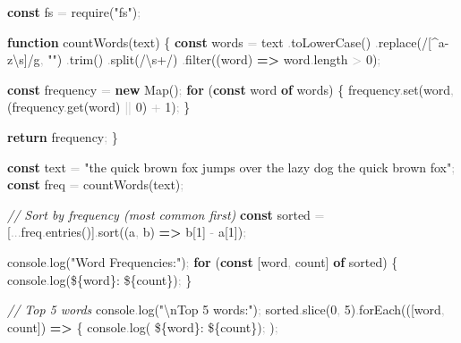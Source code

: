 \documentclass[
  justified,
  openright,
]{tufte-book}
\newcommand{\KeywordTok}[1]{\textcolor{CodeKeyword}{\textbf{#1}}}  %
\newcommand{\StringTok}[1]{\textcolor{CodeString}{#1}}              %
\newcommand{\CommentTok}[1]{\textcolor{CodeComment}{\textit{#1}}}  %
\newcommand{\CodeNumTok}[1]{\textcolor{CodeNumber}{#1}}             %
\newcommand{\CodeFuncTok}[1]{\textcolor{CodeKeyword}{#1}}           %
\newcommand{\CodeTypeTok}[1]{\textcolor{CodeType}{#1}}              %
\newcommand{\CodeAccentTok}[1]{\textcolor{CodeAccent}{#1}}          %
\newcommand{\OperatorTok}[1]{\textcolor{DarkGray}{#1}}              %
\newenvironment{Shaded}{%
  \begin{mdframed}[style=TufteCode]%
}{%
  \end{mdframed}%
}
\begin{document}
\begin{Shaded}
\begin{Highlighting}[]
\KeywordTok{const} fs \OperatorTok{=} \CodeAccentTok{require}(\StringTok{"fs"})\OperatorTok{;}
 
\KeywordTok{function} \CodeFuncTok{countWords}(text) \{
  \KeywordTok{const} words \OperatorTok{=} text
    \OperatorTok{.}\CodeFuncTok{toLowerCase}()
    \OperatorTok{.}\CodeFuncTok{replace}(\StringTok{/}\StringTok{[\^{}a{-}z\textbackslash{}s]}\StringTok{/g}\OperatorTok{,} \StringTok{""})
    \OperatorTok{.}\CodeFuncTok{trim}()
    \OperatorTok{.}\CodeFuncTok{split}(\StringTok{/}\StringTok{\textbackslash{}s+}\StringTok{/})
    \OperatorTok{.}\CodeFuncTok{filter}((word) \KeywordTok{=\textgreater{}} word\OperatorTok{.}\CodeTypeTok{length} \OperatorTok{\textgreater{}} \CodeNumTok{0})\OperatorTok{;}
 
  \KeywordTok{const} frequency \OperatorTok{=} \KeywordTok{new} Map()\OperatorTok{;}
  \KeywordTok{for} (\KeywordTok{const} word \KeywordTok{of} words) \{
    frequency\OperatorTok{.}\CodeFuncTok{set}(word\OperatorTok{,} (frequency\OperatorTok{.}\CodeFuncTok{get}(word) \OperatorTok{||} \CodeNumTok{0}) \OperatorTok{+} \CodeNumTok{1})\OperatorTok{;}
  \}
 
  \KeywordTok{return} frequency\OperatorTok{;}
\}
 
\KeywordTok{const} text \OperatorTok{=} \StringTok{"the quick brown fox jumps over the lazy dog the quick brown fox"}\OperatorTok{;}
\KeywordTok{const} freq \OperatorTok{=} \CodeFuncTok{countWords}(text)\OperatorTok{;}
 
\CommentTok{// Sort by frequency (most common first)}
\KeywordTok{const} sorted \OperatorTok{=} [\OperatorTok{...}freq\OperatorTok{.}\CodeFuncTok{entries}()]\OperatorTok{.}\CodeFuncTok{sort}((a\OperatorTok{,} b) \KeywordTok{=\textgreater{}} b[\CodeNumTok{1}] \OperatorTok{{-}} a[\CodeNumTok{1}])\OperatorTok{;}
 
console\OperatorTok{.}\CodeFuncTok{log}(\StringTok{"Word Frequencies:"})\OperatorTok{;}
\KeywordTok{for} (\KeywordTok{const} [word\OperatorTok{,} count] \KeywordTok{of} sorted) \{
  console\OperatorTok{.}\CodeFuncTok{log}(\StringTok{\textasciigrave{}\textquotesingle{}}\StringTok{\$\{}word\StringTok{\}}\StringTok{\textquotesingle{}: }\StringTok{\$\{}count\StringTok{\}}\StringTok{\textasciigrave{}})\OperatorTok{;}
\}
 
\CommentTok{// Top 5 words}
console\OperatorTok{.}\CodeFuncTok{log}(\StringTok{"}\StringTok{\textbackslash{}n}\StringTok{Top 5 words:"})\OperatorTok{;}
sorted\OperatorTok{.}\CodeFuncTok{slice}(\CodeNumTok{0}\OperatorTok{,} \CodeNumTok{5})\OperatorTok{.}\CodeFuncTok{forEach}(([word\OperatorTok{,} count]) \KeywordTok{=\textgreater{}} \{
  console\OperatorTok{.}\CodeFuncTok{log}(\StringTok{\textasciigrave{}  }\StringTok{\$\{}word\StringTok{\}}\StringTok{: }\StringTok{\$\{}count\StringTok{\}}\StringTok{\textasciigrave{}})\OperatorTok{;}
)\OperatorTok{;}
\end{Highlighting}
\end{Shaded}
\end{document}
